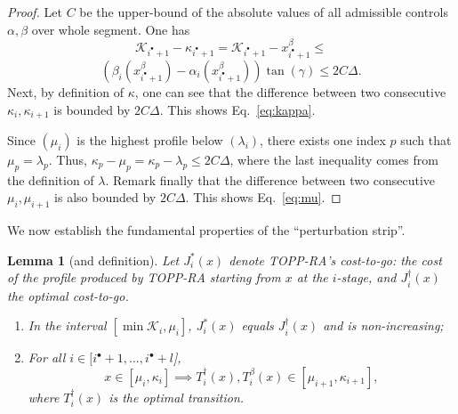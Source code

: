\documentclass[journal]{IEEEtran}
\theoremstyle{plain}
\newtheorem{lem}{Lemma}
\theoremstyle{definition}
\theoremstyle{definition}
\newcommand{\calK}{\mathcal{K}}
\begin{document}
\begin{proof}
  Let $C$ be the upper-bound of the absolute values of all admissible
  controls $\alpha,\beta$ over whole segment.  One has
  \[
  \calK_{i^\bullet+1} - \kappa_{i^\bullet+1} = \calK_{i^\bullet+1} -
  x^\beta_{i^\bullet+1} \leq
  \]
  \[(\beta_i(x^\beta_{i^\bullet+1}) -
  \alpha_i(x^\beta_{i^\bullet+1}))\tan(\gamma) \leq 2C\Delta.
  \]
  Next, by definition of $\kappa$, one can see that the difference
  between two consecutive $\kappa_i,\kappa_{i+1}$ is bounded by
  $2C\Delta$. This shows Eq.~\eqref{eq:kappa}.

  Since $(\mu_{i})$ is the highest profile below $(\lambda_{i})$, there exists
  one index $p$ such that $\mu_p=\lambda_p$. Thus,
  $\kappa_p-\mu_p = \kappa_p-\lambda_p \leq 2C\Delta$, where the last
  inequality comes from the definition of $\lambda$. Remark finally
  that the difference between two consecutive $\mu_i,\mu_{i+1}$ is also
  bounded by $2C\Delta$. This shows Eq.~\eqref{eq:mu}.
\end{proof}

We now establish the fundamental properties of the ``perturbation strip''.

\begin{lem}[and definition]
  \label{lem:boxprop}
  Let $J_i^*(x)$ denote TOPP-RA's  cost-to-go: the cost of the profile
  produced by TOPP-RA starting from $x$ at the $i$-stage, and
  $J_{i}^{\dagger}(x)$ the optimal cost-to-go.
  \begin{enumerate}
  \item[(a)] In the interval $[\min \mathcal{K}_{i}, \mu_i]$,
    $J_i^*(x)$ equals $J_i^\dagger(x)$ and
    is non-increasing;
  \item[(b)] For all $i \in [i^\bullet + 1, \dots, i^\bullet + l$], 
  \begin{equation}
    \label{eq:9}
    x \in [\mu_i , \kappa_i] \implies T_i^\dagger(x), T_i^\beta(x) \in [ \mu_{i+1} , \kappa_{i+1}],
  \end{equation}
  where $T^\dagger_i(x)$ is the optimal transition.
  \end{enumerate}
\end{lem}
\end{document}
